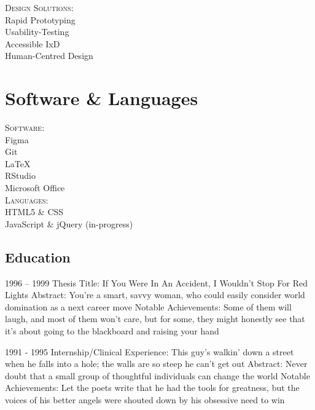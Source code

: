 \documentclass{rmjCV}
\begin{document}
\begin{paracol}{2}
\begin{leftcolumn}
\noindent \textsc{Design Solutions:}\\
Rapid Prototyping\\
Usability-Testing\\
Accessible IxD\\
Human-Centred Design

\section{Software \& Languages}
\noindent \textsc{Software:}\\
Figma\\
Git\\
LaTeX\\
RStudio\\
Microsoft Office\\

\noindent \textsc{Languages:}\\
HTML5 \& CSS\\
JavaScript \& jQuery (in-progress)\\

	
	
\end{leftcolumn}


\begin{rightcolumn}

\section{Education}

 {1996 -- 1999}
\experienceitems
{Thesis Title: If You Were In An Accident, I Wouldn't Stop For Red Lights}
{Abstract: You're a smart, savvy woman, who could easily consider world domination as a next career move}
{Notable Achievements: Some of them will laugh, and most of them won't care, but for some, they might honestly see that it's about going to the blackboard and raising your hand}

 {1991 - 1995}
\experienceitems
{Internship/Clinical Experience: This guy's walkin' down a street when he falls into a hole; the walls are so steep he can't get out}
{Abstract: Never doubt that a small group of thoughtful individuals can change the world}
{Notable Achievements: Let the poets write that he had the tools for greatness, but the voices of his better angels were shouted down by his obsessive need to win}

\end{rightcolumn}
\end{paracol}
\end{document}
